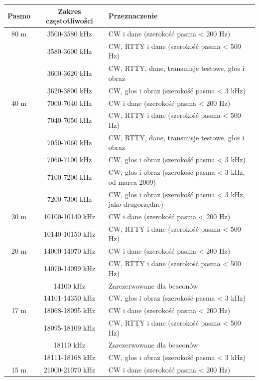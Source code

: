 \documentclass[a4paper,11pt]{article}
\begin{document}
\begin{center}
\begin{tabular}{| c | c | p{8cm} |}
\hline
\textbf{Pasmo} & \textbf{Zakres częstotliwości} & \textbf{Przeznaczenie} \\ \hline
80 m & 3500-3580 kHz & CW i dane (szerokość pasma < 200 Hz) \\ \cline{2-3}
 & 3580-3600 kHz & CW, RTTY i dane (szerokość pasma < 500 Hz) \\ \cline{2-3}
 & 3600-3620 kHz & CW, RTTY, dane, transmisje testowe, głos i obraz \\ \cline{2-3}
 & 3620-3800 kHz & CW, głos i obraz (szerokość pasma < 3 kHz) \\ \hline
40 m & 7000-7040 kHz & CW i dane (szerokość pasma < 200 Hz) \\ \cline{2-3}
 & 7040-7050 kHz & CW, RTTY i dane (szerokość pasma < 500 Hz) \\ \cline{2-3}
 & 7050-7060 kHz & CW, RTTY, dane, transmisje testowe, głos i obraz \\ \cline{2-3}
 & 7060-7100 kHz & CW, głos i obraz (szerokość pasma < 3 kHz) \\ \cline{2-3}
 & 7100-7200 kHz & CW, głos i obraz (szerokość pasma < 3 kHz, od marca 2009) \\ \cline{2-3}
 & 7200-7300 kHz & CW, głos i obraz (szerokość pasma < 3 kHz, jako drugorzędne) \\ \hline
30 m & 10100-10140 kHz & CW i dane (szerokość pasma < 200 Hz) \\ \cline{2-3}
 & 10140-10150 kHz & CW, RTTY i dane (szerokość pasma < 500 Hz) \\ \hline
20 m & 14000-14070 kHz & CW i dane (szerokość pasma < 200 Hz) \\ \cline{2-3}
 & 14070-14099 kHz & CW, RTTY i dane (szerokość pasma < 500 Hz) \\ \cline{2-3}
 & 14100 kHz & Zarezerwowane dla beaconów \\ \cline{2-3}
 & 14101-14350 kHz & CW, głos i obraz (szerokość pasma < 3 kHz) \\ \hline
17 m & 18068-18095 kHz & CW i dane (szerokość pasma < 200 Hz) \\ \cline{2-3}
 & 18095-18109 kHz & CW, RTTY i dane (szerokość pasma < 500 Hz) \\ \cline{2-3}
 & 18110 kHz & Zarezerwowane dla beaconów \\ \cline{2-3}
 & 18111-18168 kHz & CW, głos i obraz (szerokość pasma < 3 kHz) \\ \hline
15 m & 21000-21070 kHz & CW i dane (szerokość pasma < 200 Hz) \\ \cline{2-3}

\end{tabular}
\end{center}
\end{document}

